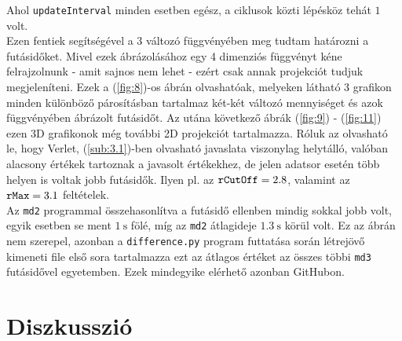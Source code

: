 \begin{multicols}{2}
\begin{equation}
\end{equation}
Ahol \texttt{updateInterval} minden esetben egész, a ciklusok közti lépésköz tehát $1$ volt. \\
Ezen fentiek segítségével a 3 változó függvényében meg tudtam határozni a futásidőket. Mivel ezek ábrázolásához egy 4 dimenziós függvényt kéne felrajzolnunk - amit sajnos nem lehet - ezért csak annak projekciót tudjuk megjeleníteni. Ezek a (\ref{fig:8})-os ábrán olvashatóak, melyeken látható 3 grafikon minden különböző párosításban tartalmaz két-két változó mennyiséget és azok függvényében ábrázolt futásidőt. Az utána következő ábrák (\ref{fig:9}) - (\ref{fig:11}) ezen 3D grafikonok még további 2D projekciót tartalmazza. Róluk az olvasható le, hogy Verlet, (\ref{sub:3.1})-ben olvasható javaslata viszonylag helytálló, valóban alacsony értékek tartoznak a javasolt értékekhez, de jelen adatsor esetén több helyen is voltak jobb futásidők. Ilyen pl. az $\text{\texttt{rCutOff}} = 2.8$, valamint az $\text{\texttt{rMax}} = 3.1$ feltételek. \\
Az \texttt{md2} programmal összehasonlítva a futásidő ellenben mindig sokkal jobb volt, egyik esetben se ment $1\ \text{s}$ fölé, míg az \texttt{md2} átlagideje $1.3\ \text{s}$ körül volt. Ez az ábrán nem szerepel, azonban a \texttt{difference.py} program futtatása során létrejövő kimeneti file első sora tartalmazza ezt az átlagos értéket az összes többi \texttt{md3} futásidővel egyetemben. Ezek mindegyike elérhető azonban GitHubon\cite{github}.

\section{Diszkusszió} \label{sec:7}

\end{multicols}